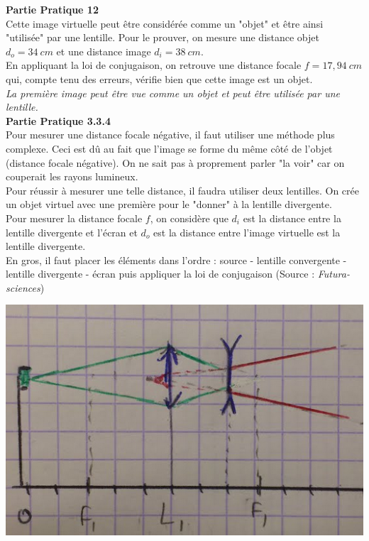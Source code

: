 \documentclass	[11pt, a4paper, openany]{book}
\begin{document}
\textbf{Partie Pratique 12}\\
Cette image virtuelle peut être considérée comme un "objet" et être ainsi "utilisée" par une lentille. Pour le prouver, on mesure une distance objet $d_o = 34\ cm$ et une distance image $d_i = 38\ cm$.\\
En appliquant la loi de conjugaison, on retrouve une distance focale $f = 17,94\ cm$ qui, compte tenu des erreurs, vérifie bien que cette image est un objet.\\
\textit{La première image peut être vue comme un objet et peut être utilisée  par une lentille.}\\

\textbf{Partie Pratique 3.3.4}\\
Pour mesurer une distance focale négative, il faut utiliser une méthode plus complexe. Ceci est dû au fait que l'image se forme du même côté de l'objet (distance focale négative). On ne sait pas à proprement parler "la voir" car on couperait les rayons lumineux.\\
Pour réussir à mesurer une telle distance, il faudra utiliser deux lentilles. On crée un objet virtuel avec une première pour le "donner" à la lentille divergente.\\

Pour mesurer la distance focale $f$, on considère que $d_i$ est la distance entre la lentille divergente et l'écran et $d_o$ est la distance entre  l'image virtuelle est la lentille divergente.\\

En gros, il faut placer les éléments dans l'ordre : source - lentille convergente - lentille divergente - écran puis appliquer la loi de conjugaison (Source : \textit{Futura-sciences})
\begin{center}
\includegraphics[scale=0.5]{labo/image33.png}
\end{center}
\end{document}
